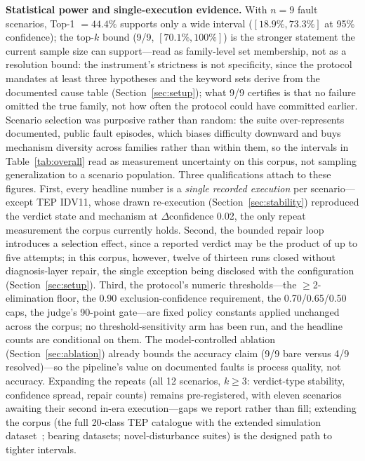\documentclass[preprint,10pt]{elsarticle}
\begin{document}
\textbf{Statistical power and single-execution evidence.} With $n{=}9$ fault scenarios, Top-1 $=44.4\%$ supports only a wide interval ($[18.9\%,73.3\%]$ at 95\% confidence); the top-$k$ bound (9/9, $[70.1\%,100\%]$) is the stronger statement the current sample size can support---read as family-level set membership, not as a resolution bound: the instrument's strictness is not specificity, since the protocol mandates at least three hypotheses and the keyword sets derive from the documented cause table (Section~\ref{sec:setup}); what 9/9 certifies is that no failure omitted the true family, not how often the protocol could have committed earlier. Scenario selection was purposive rather than random: the suite over-represents documented, public fault episodes, which biases difficulty downward and buys mechanism diversity across families rather than within them, so the intervals in Table~\ref{tab:overall} read as measurement uncertainty on this corpus, not sampling generalization to a scenario population. Three qualifications attach to these figures. First, every headline number is a \emph{single recorded execution} per scenario---except TEP IDV11, whose drawn re-execution (Section~\ref{sec:stability}) reproduced the verdict state and mechanism at $\Delta$confidence 0.02, the only repeat measurement the corpus currently holds. Second, the bounded repair loop introduces a selection effect, since a reported verdict may be the product of up to five attempts; in this corpus, however, twelve of thirteen runs closed without diagnosis-layer repair, the single exception being disclosed with the configuration (Section~\ref{sec:setup}). Third, the protocol's numeric thresholds---the $\ge$2-elimination floor, the 0.90 exclusion-confidence requirement, the 0.70/0.65/0.50 caps, the judge's 90-point gate---are fixed policy constants applied unchanged across the corpus; no threshold-sensitivity arm has been run, and the headline counts are conditional on them. The model-controlled ablation (Section~\ref{sec:ablation}) already bounds the accuracy claim (9/9 bare versus 4/9 resolved)---so the pipeline's value on documented faults is process quality, not accuracy. Expanding the repeats (all 12 scenarios, $k\ge3$: verdict-type stability, confidence spread, repair counts) remains pre-registered, with eleven scenarios awaiting their second in-era execution---gaps we report rather than fill; extending the corpus (the full 20-class TEP catalogue with the extended simulation dataset~\cite{reinartz2021extended}; bearing datasets; novel-disturbance suites) is the designed path to tighter intervals.
\end{document}
